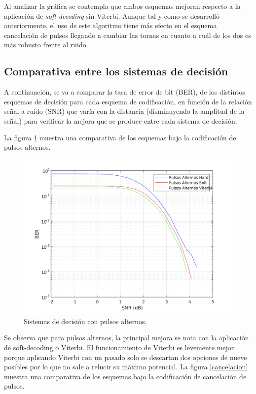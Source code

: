 Al analizar la gráfica se contempla que ambos esquemas mejoran respecto a la aplicación
de \textit{soft-decoding} sin Viterbi. Aunque tal y como se desarrolló anteriormente,
el uso de este algoritmo tiene más efecto en el esquema cancelación de pulsos llegando
a cambiar las tornas en cuanto a cuál de los dos es más robusto frente al ruido.


\subsection{Comparativa entre los sistemas de decisión}
A continuación, se va a comparar la tasa de error de bit (BER), de los distintos esquemas de decisión para cada esquema 
de codificación, en función de la relación señal a ruido (SNR) que varía con la distancia (disminuyendo la 
amplitud de la señal) para verificar la mejora que se produce entre cada sistema de decisión.

La figura \ref{alternos} muestra una comparativa de los esquemas bajo 
la codificación de pulsos alternos.

\begin{figure}[ht]
    \centering
    \includegraphics[scale=0.7]{./figuras/alternos.pdf}
    \caption{\small{Sistemas de decisión con pulsos alternos.}}
    \label{alternos}%
\end{figure}

Se observa que para pulsos alternos, la principal mejora se nota con la aplicación 
de soft-decoding o Viterbi. El funcionamiento de Viterbi es levemente mejor porque 
aplicando Viterbi con un pasado solo se descartan dos opciones de nueve posibles por lo 
que no sale a relucir su máximo potencial. 
\newpage
La figura \ref{cancelacion} muestra una comparativa de los esquemas bajo 
la codificación de cancelación de pulsos.

